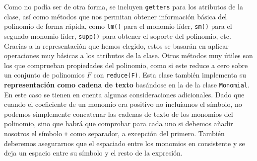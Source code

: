 Como no podía ser de otra forma, se incluyen \texttt{getters} para los atributos de la clase, así como métodos que nos permitan obtener información básica del polinomio de forma rápida, como \texttt{lm()} para el monomio líder, \texttt{sm()} para el segundo monomio líder, \texttt{supp()} para obtener el soporte del polinomio, etc. Gracias a la representación que hemos elegido, estos se basarán en aplicar operaciones muy básicas a los atributos de la clase. Otros métodos muy útiles son los que comprueban propiedades del polinomio, como si este reduce a cero sobre un conjunto de polinomios $F$ con \texttt{reduce(F)}. Esta clase también implementa su \textbf{representación como cadena de texto} basándose en la de la clase \texttt{Monomial}. En este caso se tienen en cuenta algunas consideraciones adicionales. Dado que cuando el coeficiente de un monomio era positivo no incluíamos el símbolo, no podemos simplemente concatenar las cadenas de texto de los monomios del polinomio, sino que habrá que comprobar para cada uno si debemos añadir nosotros el símbolo \texttt{+} como separador, a excepción del primero. También deberemos asegurarnos que el espaciado entre los monomios en consistente y se deja un espacio entre su símbolo y el resto de la expresión.\newline


